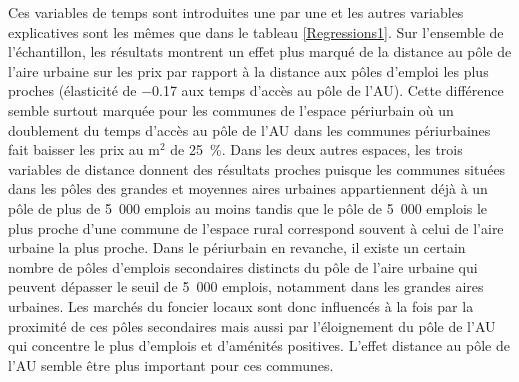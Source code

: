 \documentclass[10.5pt,a4paper]{article}
\begin{document}
{Ces variables de temps sont introduites une par une et les autres variables explicatives sont les mêmes que dans le tableau \ref{Regressions1}. Sur l'ensemble de l'échantillon, les résultats montrent un effet plus marqué de la distance au pôle de l'aire urbaine sur les prix par rapport à la distance aux pôles d'emploi les plus proches (élasticité de −0.17 aux temps d'accès au pôle de l'AU). Cette différence semble surtout marquée pour les communes de l'espace périurbain où un doublement du temps d'accès au pôle de l'AU dans les communes périurbaines fait baisser les prix au m$^2$ de 25~\%. Dans les deux autres espaces, les trois variables de distance donnent des résultats proches puisque les communes situées dans les pôles des grandes et moyennes aires urbaines appartiennent déjà à un pôle de plus de 5~000 emplois au moins tandis que le pôle de 5~000 emplois le plus proche d'une commune de l'espace rural correspond souvent à celui de l'aire urbaine la plus proche. Dans le périurbain en revanche, il existe un certain nombre de pôles d'emplois secondaires distincts du pôle de l'aire urbaine qui peuvent dépasser le seuil de 5~000 emplois, notamment dans les grandes aires urbaines. Les marchés du foncier locaux sont donc influencés à la fois par la proximité de ces pôles secondaires mais aussi par l'éloignement du pôle de l'AU qui concentre le plus d'emplois et d'aménités positives. L'effet distance au pôle de l'AU semble être plus important pour ces communes. \par
%

 

}
\end{document}
